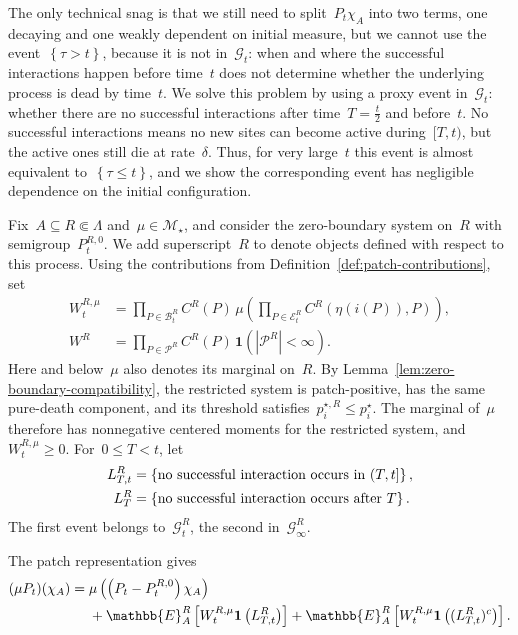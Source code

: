 \documentclass[EJP,preprint,NODS,nobera]{ejpecp}
\newcommand{\E}{\mathbb{E}}
\newcommand{\bb}[1]{\left(#1\right)}
\newcommand{\Cb}[1]{\left[#1\right]}
\newcommand{\cb}[1]{\left\{#1\right\}}
\newcommand{\abs}[1]{\left|#1\right|}
\newcommand{\ind}{\mathbf{1}}
\begin{document}
The only technical snag is that we still need to split~$P_t\chi_A$ into two terms, one decaying and one weakly dependent on initial measure, but we cannot use the event~$\cb{\tau >t}$, because it is not in~$\mathcal{G}_t$: when and where the successful interactions happen before time~$t$ does not determine whether the underlying process is dead by time~$t$. We solve this problem by using a proxy event in~$\mathcal{G}_t$: whether there are no successful interactions after time~$T=\frac{t}{2}$ and before~$t$. No successful interactions means no new sites can become active during~$[T,t)$, but the active ones still die at rate~$\delta$. Thus, for very large~$t$ this event is almost equivalent to~$\cb{\tau\leq t}$, and we show the corresponding event has negligible dependence on the initial configuration.

{\color{red}
Fix~$A\subseteq R\Subset\Lambda$ and~$\mu\in\mathcal M_\star$, and consider the zero-boundary system
on~$R$ with semigroup~$P_t^{R,0}$. We add superscript~$R$ to denote objects defined with respect to this process.
Using the contributions from Definition~\ref{def:patch-contributions}, set
\begin{align*}
W_t^{R,\mu}
&=\prod_{P\in\mathcal B_t^R}C^R(P)\,
  \mu\bb{\prod_{P\in\mathcal E_t^R}C^R\bb{\eta(i(P)),P}},
\\
W^R&=\prod_{P\in\mathcal P^R}C^R(P)\,
\ind\bb{\abs{\mathcal P^R}<\infty}.
\end{align*}
Here and below~$\mu$ also denotes its marginal on~$R$.
By Lemma~\ref{lem:zero-boundary-compatibility}, the restricted system is
patch-positive, has the same pure-death component, and its threshold
satisfies~$p_i^{\star,R}\leq p_i^\star$. The marginal of~$\mu$ therefore has
nonnegative centered moments for the restricted system, and~$W_t^{R,\mu}\geq0$.
For~$0\leq T<t$, let
\begin{align}
L_{T,t}^R
&=\cb{\text{no successful interaction occurs in }(T,t]},
\notag\\
L_T^R
&=\cb{\text{no successful interaction occurs after }T}.
\label{eq:no-late-interaction-events}
\end{align}
The first event belongs to~$\mathcal G_t^R$, the second in~$\mathcal{G}_\infty^R$.

The patch representation gives
\begin{align}
(\mu P_t)(\chi_A)
={}&\mu\bb{\bb{P_t-P_t^{R,0}}\chi_A}
\notag\\
&+\E_A^R\Cb{W_t^{R,\mu}\ind\bb{L_{T,t}^R}}
 +\E_A^R\Cb{W_t^{R,\mu}\ind\bb{(L_{T,t}^R)^c}}.
\label{eq:two-term-proof-plan}
\end{align}
}
\end{document}
